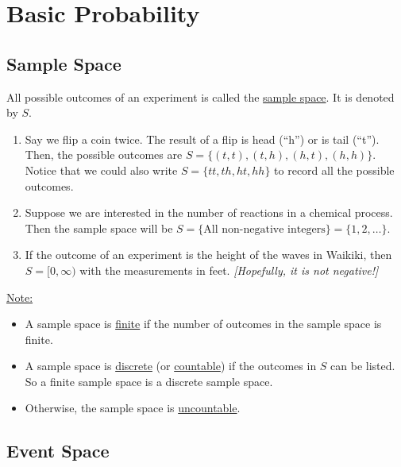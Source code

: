 \chapter{Basic Probability}

\section{Sample Space}

\begin{definition}
All possible outcomes of an experiment is called the \underline{sample space}. It is denoted by $S$.
\end{definition}

\begin{example}\label{Ex:MoreSampleSpaces}
\begin{enumerate}[label=\alph*)]
\item\label{Ex:SampleSpaceFlip2Coins} Say we flip a coin twice. The result of a flip is head (``h'') or is tail (``t''). Then, the possible outcomes are $S = \{ (t, t), (t, h), (h, t), (h, h) \}$. Notice that we could also write $S = \{ tt, th, ht, hh \}$ to record all the possible outcomes.
\item\label{Ex:SampleSpaceChemist} Suppose we are interested in the number of reactions in a chemical process. Then the sample space will be $S = \{ \text{All non-negative integers} \} = \{1 , 2 , \ldots \}$.
\item\label{Ex:WaveSampleSpace} If the outcome of an experiment is the height of the waves in Waikiki, then $S = [0, \infty )$ with the measurements in feet. \textit{[Hopefully, it is not negative!]}
\end{enumerate}
\end{example}

\underline{Note:}
	\begin{itemize}
	\item A sample space is \underline{finite} if the number of outcomes in the sample space is finite.
	\item A sample space is \underline{discrete} (or \underline{countable}) if the outcomes in $S$ can be listed. So a finite sample space is a discrete sample space.
	\item Otherwise, the sample space is \underline{uncountable}.
	\end{itemize}
	
\section{Event Space}

